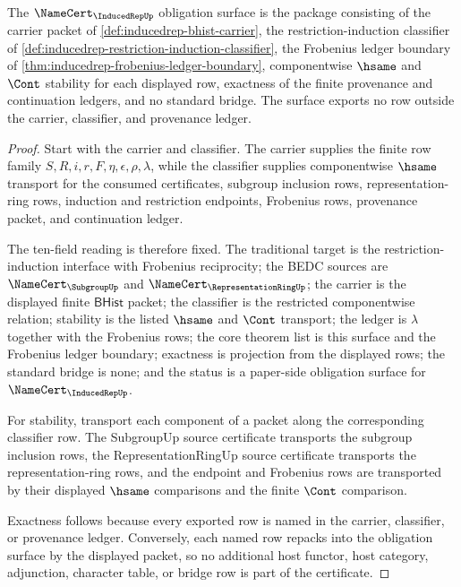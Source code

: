 \begin{theorem}
\label{thm:inducedrep-namecert-obligation-surface}
The $\NameCert_{\InducedRepUp}$ obligation surface is the package consisting
of the carrier packet of \autoref{def:inducedrep-bhist-carrier}, the
restriction-induction classifier of
\autoref{def:inducedrep-restriction-induction-classifier}, the Frobenius
ledger boundary of \autoref{thm:inducedrep-frobenius-ledger-boundary},
componentwise $\hsame$ and $\Cont$ stability for each displayed row, exactness
of the finite provenance and continuation ledgers, and no standard bridge.
The surface exports no row outside the carrier, classifier, and provenance
ledger.
\end{theorem}
\begin{proof}
Start with the carrier and classifier. The carrier supplies the finite row
family $S,R,i,r,F,\eta,\epsilon,\rho,\lambda$, while the classifier supplies
componentwise $\hsame$ transport for the consumed certificates, subgroup
inclusion rows, representation-ring rows, induction and restriction endpoints,
Frobenius rows, provenance packet, and continuation ledger.

The ten-field reading is therefore fixed. The traditional target is the
restriction-induction interface with Frobenius reciprocity; the BEDC sources
are $\NameCert_{\SubgroupUp}$ and $\NameCert_{\RepresentationRingUp}$; the
carrier is the displayed finite $\mathsf{BHist}$ packet; the classifier is
the restricted componentwise relation; stability is the listed $\hsame$ and
$\Cont$ transport; the ledger is $\lambda$ together with the Frobenius rows;
the core theorem list is this surface and the Frobenius ledger boundary;
exactness is projection from the displayed rows; the standard bridge is none;
and the status is a paper-side obligation surface for
$\NameCert_{\InducedRepUp}$.

For stability, transport each component of a packet along the corresponding
classifier row. The SubgroupUp source certificate transports the subgroup
inclusion rows, the RepresentationRingUp source certificate transports the
representation-ring rows, and the endpoint and Frobenius rows are transported
by their displayed $\hsame$ comparisons and the finite $\Cont$ comparison.

Exactness follows because every exported row is named in the carrier,
classifier, or provenance ledger. Conversely, each named row repacks into the
obligation surface by the displayed packet, so no additional host functor,
host category, adjunction, character table, or bridge row is part of the
certificate.
\end{proof}
